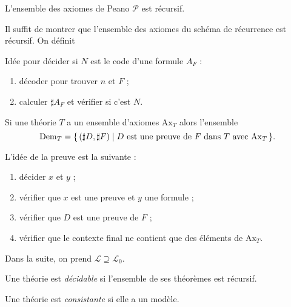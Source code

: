 \documentclass[./main]{subfiles}
\begin{document}
 \begin{lem}
   L'ensemble des axiomes de Peano $\mathcal{P}$ est récursif.
 \end{lem}
 \begin{prv}
   Il suffit de montrer que l'ensemble des axiomes du schéma de récurrence est récursif.
   On définit


  Idée pour décider si $N$ est le code d'une formule $A_F$ : 
  \begin{enumerate}
    \item décoder pour trouver $n$ et $F$ ;
    \item calculer $\sharp A_F$ et vérifier si c'est $N$.
  \end{enumerate}
 \end{prv}

 \begin{prop}
   Si une théorie $T$ a un ensemble d'axiomes $\mathrm{Ax}_T$ alors l'ensemble \[
   \mathrm{Dem}_T = \mleft\{\, (\sharp D, \sharp F) \;\middle|\; \text{$D$ est une preuve de $F$ dans $T$ avec $\mathrm{Ax}_T$}\,\mright\} 
   .\] 
 \end{prop}
 \begin{prv}
   L'idée de la preuve est la suivante :
   \begin{enumerate}
     \item décider $x$ et $y$ ;
     \item vérifier que $x$ est une preuve et $y$ une formule ;
     \item vérifier que $D$ est une preuve de $F$ ;
     \item vérifier que le contexte final ne contient que des éléments de $\mathrm{Ax}_T$.
   \end{enumerate}
 \end{prv}

 Dans la suite, on prend $\mathcal{L} \supseteq \mathcal{L}_0$.

 \begin{defn}
   Une théorie est \textit{décidable} si l'ensemble de ses théorèmes est récursif.
 \end{defn}

 \begin{rmk}[Rappel]
   Une théorie est \textit{consistante} si elle a un modèle.
 \end{rmk}
\end{document}
